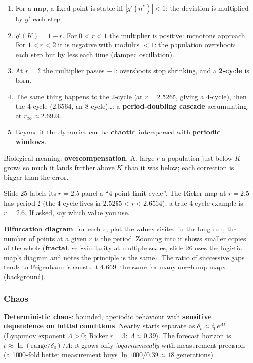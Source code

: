 \begin{chain}
\begin{enumerate}
\item For a map, a fixed point is stable iff $|g'(n^*)|<1$: the deviation is multiplied by $g'$ each step.
\item $g'(K)=1-r$. For $0<r<1$ the multiplier is positive: monotone approach. For $1<r<2$ it is negative with
modulus $<1$: the population overshoots each step but by less each time (damped oscillation).
\item At $r=2$ the multiplier passes $-1$: overshoots stop shrinking, and a \textbf{2-cycle} is born.
\item The same thing happens to the 2-cycle (at $r=2.5265$, giving a 4-cycle), then the 4-cycle ($2.6564$, an
8-cycle)\dots: a \textbf{period-doubling cascade} accumulating at $r_\infty\approx2.6924$.
\item Beyond it the dynamics can be \textbf{chaotic}, interspersed with \textbf{periodic windows}.
\end{enumerate}
Biological meaning: \textbf{overcompensation}. At large $r$ a population just below $K$ grows so much it lands
further above $K$ than it was below; each correction is bigger than the error.
\end{chain}

\begin{trap}
Slide 25 labels its $r=2.5$ panel a ``4-point limit cycle''. The Ricker map at $r=2.5$ has period 2 (the 4-cycle lives
in $2.5265<r<2.6564$); a true 4-cycle example is $r=2.6$. If asked, say which value you use.
\end{trap}

\textbf{Bifurcation diagram}: for each $r$, plot the values visited in the long run; the number of points at a given
$r$ is the period. Zooming into it shows smaller copies of the whole (\textbf{fractal}: self-similarity at multiple
scales; slide 26 uses the logistic map's diagram and notes the principle is the same). The ratio of successive gaps
tends to Feigenbaum's constant $4.669$, the same for many one-hump maps (background).

\subsubsection*{Chaos}
\textbf{Deterministic chaos}: bounded, aperiodic behaviour with \textbf{sensitive dependence on initial conditions}.
Nearby starts separate as $\delta_t\approx\delta_0e^{\Lambda t}$ (Lyapunov exponent $\Lambda>0$; Ricker $r=3$:
$\Lambda\approx0.39$). The forecast horizon is $t\approx\ln(\text{range}/\delta_0)/\Lambda$: it grows only
\emph{logarithmically} with measurement precision (a 1000-fold better measurement buys $\ln 1000/0.39\approx18$
generations).


